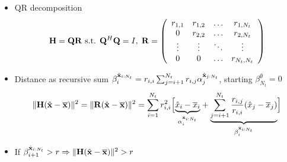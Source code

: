 \documentclass[xcolor=dvipsnames,aspectratio=169]{beamer}
\begin{document}
{  \begin{itemize}
            \item QR decomposition 
            $$\mathbf{H}=\mathbf{Q}\mathbf{R}\textnormal{ s.t. }\mathbf{Q}^H\mathbf{Q}=I,\;\mathbf{R}=\left(\begin{array}{cccc}
            r_{1,1}&r_{1,2}&\dots&r_{1,N_t}\\
            0&r_{2,2}&\dots&r_{2,N_t}\\
            \vdots&\vdots&\ddots&\vdots\\
            0&0&\dots&r_{N_t,N_t}\\
\end{array}\right)$$
            \item Distance as recursive sum $\beta_i^{\hat{\mathbf{x}}_{i:N_t}}=r_{i,i}\sum_{j=i+1}^{N_t}r_{i,j}\alpha_j^{\hat{\mathbf{x}}_{j:N_t}}$, starting $\beta_{N_t}^{\emptyset}=0$
$$\|\mathbf{H}(\hat{\mathbf{x}}-\overline{\mathbf{x}})\|^2=\|\mathbf{R}(\hat{\mathbf{x}}-\overline{\mathbf{x}})\|^2=\sum_{i=1}^{N_t}r_{i,i}^2\Big[\underset{\alpha_i^{\hat{\mathbf{x}}_{i:N_t}}}{\underbrace{\hat{x}_i-\overline{x}_i}}+\underset{\beta_i^{\hat{\mathbf{x}}_{i:N_t}}}{\underbrace{\sum_{j=i+1}^{N_t}\frac{r_{i,j}}{r_{i,i}}(\hat{x}_j-\overline{x}_j)}}\Big]$$
            \item If $\beta_{i+1}^{\hat{\mathbf{x}}_{i:N_t}}>r\Rightarrow \|\mathbf{H}(\hat{\mathbf{x}}-\overline{\mathbf{x}})\|^2>r$
        \end{itemize}

\pagebreak
        
  \begin{columns}
 \begin{column}{6cm}
 

\end{column}
\end{columns}}
\end{document}
